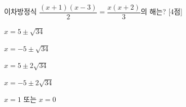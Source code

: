 이차방정식 $\dfrac{(x+1)(x-3)}{2}=\dfrac{x(x+2)}{3}$의 해는? \mbox{[4점]}
\begin{choicesii}{\rule[-3ex]{0pt}{8ex}$x=5\pm\sqrt{34}$}{\rule[-3ex]{0pt}{8ex}$x=-5\pm\sqrt{34}$}{\rule[-3ex]{0pt}{8ex}$x=5\pm2\sqrt{34}$}{\rule[-3ex]{0pt}{8ex}$x=-5\pm2\sqrt{34}$}{\rule[-3ex]{0pt}{8ex}$x=1$ 또는 $x=0$}\end{choicesii}
